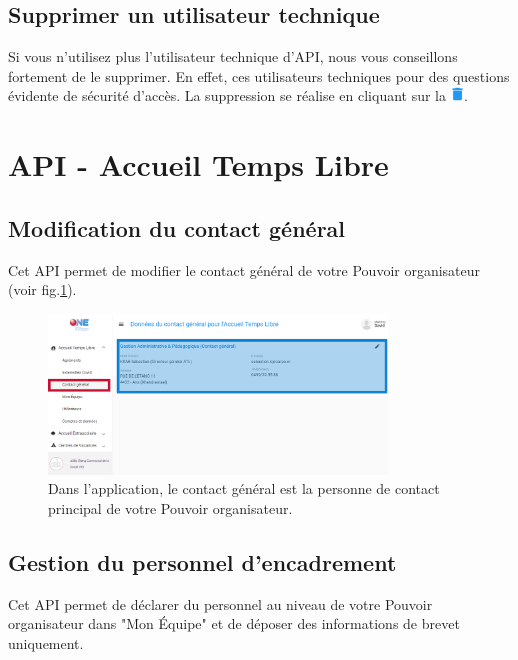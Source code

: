 \subsection{Supprimer un utilisateur technique}
Si vous n'utilisez plus l'utilisateur technique d'API, nous vous conseillons fortement de le supprimer. En effet, ces utilisateurs techniques pour des questions évidente de sécurité d'accès. La suppression se réalise en cliquant sur la \includegraphics[width=0.35cm]{Images/icon/button_poubelle_api.png}. 



\section{API - Accueil Temps Libre}\label{api:atl}

\subsection{Modification du contact général}
Cet API permet de modifier le contact général de votre Pouvoir organisateur (voir fig.\ref{fig:general_contact}).

\begin{figure}[h!]
    \centering
    \includegraphics[width=9cm,frame]{Images/api/general_contact.png}
    \caption{Dans l'application, le contact général est la personne de contact principal de votre Pouvoir organisateur.}
    \label{fig:general_contact}
\end{figure}



\subsection{Gestion du personnel d'encadrement}
Cet API permet de déclarer du personnel au niveau de votre Pouvoir organisateur dans "Mon Équipe" et de déposer des informations de brevet uniquement.

